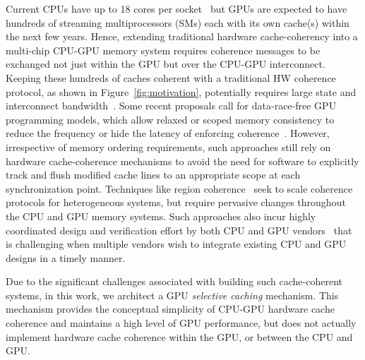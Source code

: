 Current CPUs have up to 18 cores per socket~\cite{INTELXEONE5V3} but GPUs are
expected to have hundreds of streaming multiprocessors (SMs) each with its own
cache(s) within the next few years. Hence, extending traditional hardware
cache-coherency into a multi-chip CPU-GPU memory system requires coherence
messages to be exchanged not just within the GPU but over the CPU-GPU
interconnect. Keeping these hundreds of caches coherent with a traditional HW
coherence protocol, as shown in Figure~\ref{fig:motivation}, potentially
requires large state and interconnect bandwidth~\cite{Kelm2010,johnson2011}.
Some recent proposals call for data-race-free GPU programming models, which
allow relaxed or scoped memory consistency to reduce the frequency or hide the
latency of enforcing coherence~\cite{Hechtman2014}.  However, irrespective of
memory ordering requirements, such approaches still rely on hardware
cache-coherence mechanisms to  avoid the need for software to explicitly track
and flush modified cache lines to an appropriate scope at each synchronization
point. Techniques like region coherence~\cite{Power2013} seek to scale coherence
protocols for heterogeneous systems, but require pervasive changes throughout
the CPU and GPU memory systems. Such approaches also incur highly coordinated
design and verification effort by both CPU and GPU vendors~\cite{Hong2012} that
is challenging when multiple vendors wish to integrate existing CPU and GPU
designs in a timely manner.

Due to the significant challenges associated with building such cache-coherent
systems, in this work, we architect a GPU \textit{selective caching} mechanism.
This mechanism provides the conceptual simplicity of CPU-GPU hardware cache
coherence and maintains a high level of GPU performance, but does not actually
implement hardware cache coherence within the GPU, or between the CPU and GPU.

